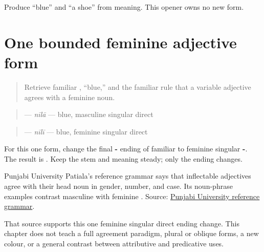 \begin{tcolorbox}[breakable,colback=teal!4,colframe=teal!35!black,title={Before you move on}]
Produce “blue” and “a shoe” from meaning. This opener owns no new form.
\end{tcolorbox}
\section[\texorpdfstring{\pa{ਨੀਲੀ} (nili)}{ਨੀਲੀ (nili)}]{One bounded feminine adjective form}

\label{lesson:PA-C209-nili}



\begin{quote}
Retrieve familiar \textbf{}, “blue,” and the familiar rule that a variable adjective agrees with a feminine noun.
\end{quote}

\begin{grammarlens}[title={Grammar Lens: direct owner}]
\begin{quote}
\textbf{} — \emph{nīlā} — blue, masculine singular direct
\end{quote}

\begin{quote}
\textbf{} — \emph{nīlī} — blue, feminine singular direct
\end{quote}

For this one form, change the final \textbf{-} ending of familiar \textbf{} to feminine singular \textbf{-}. The result is \textbf{}. Keep the stem and meaning steady; only the ending changes.
\end{grammarlens}

\begin{grammarlens}[title={Grammar Lens: source boundary}]
Punjabi University Patiala's reference grammar says that inflectable adjectives agree with their head noun in gender, number, and case. Its noun-phrase examples contrast masculine \textbf{ } with feminine \textbf{ }. Source: \href{https://pt.learnpunjabi.org/assets/a\%20reference\%20grammar\_final.pdf}{Punjabi University reference grammar}.

That source supports this one feminine singular direct ending change. This chapter does not teach a full agreement paradigm, plural or oblique forms, a new colour, or a general contrast between attributive and predicative uses.
\end{grammarlens}

